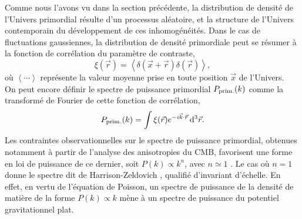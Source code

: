 Comme nous l'avons vu dans la section précédente, la distribution de densité de l'Univers primordial résulte d'un processus aléatoire, et la structure de l'Univers contemporain du développement de ces inhomogénéités.
Dans le cas de fluctuations gaussiennes, la distribution de densité primordiale peut se résumer à la fonction de corrélation du paramètre de contraste,
\begin{equation}
    \xi(\vec{r}) = \left< \delta(\vec{x} + \vec{r}) \delta(\vec{r}) \right>,
\end{equation}
où $\left< \cdots \right>$ représente la valeur moyenne prise en toute position $\vec{x}$ de l'Univers. \\
On peut encore définir le spectre de puissance primordial $P_{\rm prim.}(k)$ comme la transformé de Fourier de cette fonction de corrélation, %
\begin{equation}
    P_{\rm prim.}(k) = \int \xi(\vec{r}) e^{-i \vec{k} \cdot \vec{r}} \, \mathrm{d}^3 \vec{r}.
\end{equation}
Les contraintes observationnelles sur le spectre de puissance primordial, obtenues notamment à partir de l'analyse des anisotropies du CMB, favorisent une forme en loi de puissance de ce dernier, soit $P(k) \propto k^n$, avec $n \simeq 1$ \cite{planck_collaboration_planck_2020}.
Le cas où $n = 1$ donne le spectre dit de Harrison-Zeldovich \cite{harrison_fluctuations_1970,zeldovich_hypothesis_1972}, qualifié d'invariant d'échelle.
En effet, en vertu de l'équation de Poisson, un spectre de puissance de la densité de matière de la forme $P(k) \propto k$ mène à un spectre de puissance du potentiel gravitationnel plat.

